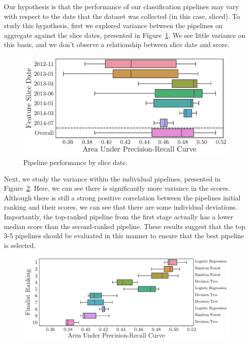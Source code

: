 \documentclass[../thesis/thesis.tex]{subfiles}
\begin{document}
Our hypothesis is that the performance of our classification pipelines may vary with respect to the date that the dataset was collected (in this case, sliced). To study this hypothesis, first we explored variance between the pipelines on aggregate against the slice dates, presented in Figure~\ref{fig:design:selection_agg_slice}. We see little variance on this basis, and we don't observe a relationship between slice date and score.

\begin{figure}[!htb]
    \centering
    \includegraphics[width=\textwidth]{../figures/design/selection_agg_slice}
    \caption[Pipeline performance by slice date]{Pipeline performance by slice date.}
    \label{fig:design:selection_agg_slice}
\end{figure}

Next, we study the variance within the individual pipelines, presented in Figure~\ref{fig:design:selection_agg_rank}. Here, we can see there is significantly more variance in the scores. Although there is still a strong positive correlation between the pipelines initial ranking and their scores, we can see that there are some individual deviations. Importantly, the top-ranked pipeline from the first stage actually has a lower median score than the second-ranked pipeline. These results suggest that the top 3-5 pipelines should be evaluated in this manner to ensure that the best pipeline is selected.

\begin{figure}[!htb]
    \centering
    \includegraphics[width=\textwidth]{../figures/design/selection_agg_rank}
    \caption[Overview of finalist pipeline performance]{}
    \label{fig:design:selection_agg_rank}
\end{figure}
\end{document}
